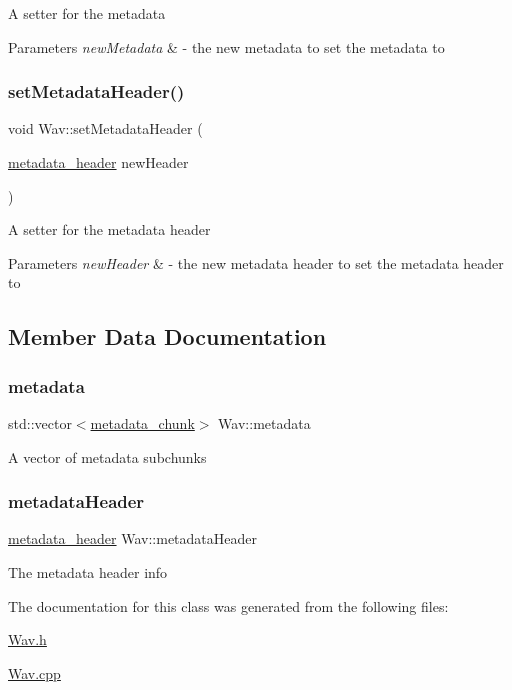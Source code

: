 A setter for the metadata 
\begin{DoxyParams}{Parameters}
{\em new\+Metadata} & -\/ the new metadata to set the metadata to \\
\hline
\end{DoxyParams}
\mbox{\label{classWav_a22586ef9396d094658ffc51e0d2108d5}} 
\subsubsection{\texorpdfstring{set\+Metadata\+Header()}{setMetadataHeader()}}
{\footnotesize\ttfamily void Wav\+::set\+Metadata\+Header (\begin{DoxyParamCaption}\item[{\hyperlink{structmetadata__header}{metadata\+\_\+header}}]{new\+Header }\end{DoxyParamCaption})}

A setter for the metadata header 
\begin{DoxyParams}{Parameters}
{\em new\+Header} & -\/ the new metadata header to set the metadata header to \\
\hline
\end{DoxyParams}


\subsection{Member Data Documentation}
\mbox{\label{classWav_a69b39a8dd2ddd962b6acb966e0f454ee}} 
\subsubsection{\texorpdfstring{metadata}{metadata}}
{\footnotesize\ttfamily std\+::vector$<$\hyperlink{structmetadata__chunk}{metadata\+\_\+chunk}$>$ Wav\+::metadata\hspace{0.3cm}{\ttfamily [protected]}}

A vector of metadata subchunks \mbox{\label{classWav_a4ddb72dc81101f50ef1f6c4d0e8dc257}} 
\subsubsection{\texorpdfstring{metadata\+Header}{metadataHeader}}
{\footnotesize\ttfamily \hyperlink{structmetadata__header}{metadata\+\_\+header} Wav\+::metadata\+Header\hspace{0.3cm}{\ttfamily [protected]}}

The metadata header info 

The documentation for this class was generated from the following files\+:\begin{DoxyCompactItemize}
\item 
\hyperlink{Wav_8h}{Wav.\+h}\item 
\hyperlink{Wav_8cpp}{Wav.\+cpp}\end{DoxyCompactItemize}

